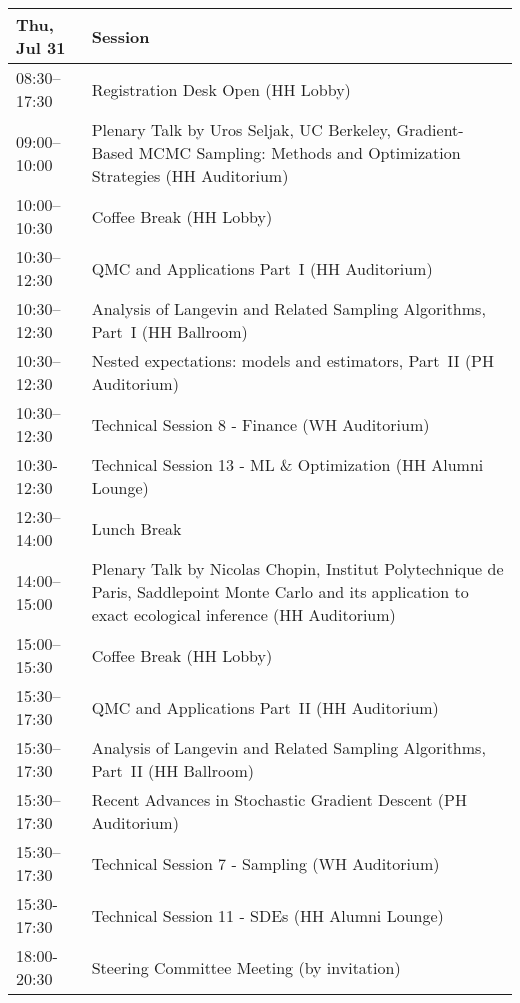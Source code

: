 \begin{table}
{\footnotesize
\begin{tabularx}{\textwidth}{>{\hsize=0.32\hsize}X|>{\hsize=1.7\hsize}X}
\hline
\textbf{Thu, Jul 31} & \textbf{Session} \\
\hline
\cellcolor{\EmptyColor}08:30–17:30 & \cellcolor{\EmptyColor}Registration Desk Open (HH Lobby) \\
\cellcolor{\PlenaryColor}09:00–10:00 & \cellcolor{\PlenaryColor}Plenary Talk by Uros Seljak, UC Berkeley, Gradient-Based MCMC Sampling: Methods and Optimization Strategies (HH Auditorium) \\
\cellcolor{\EmptyColor}10:00–10:30 & \cellcolor{\EmptyColor}Coffee Break (HH Lobby) \\
\cellcolor{\SessionTitleColor}10:30–12:30 & \cellcolor{\SessionTitleColor}QMC and Applications Part~I (HH Auditorium) \\
\cellcolor{\SessionTitleColor}10:30–12:30 & \cellcolor{\SessionTitleColor}Analysis of Langevin and Related Sampling Algorithms, Part~I (HH Ballroom) \\
\cellcolor{\SessionTitleColor}10:30–12:30 & \cellcolor{\SessionTitleColor}Nested expectations: models and estimators, Part~II (PH Auditorium) \\
\cellcolor{\SessionLightColor}10:30–12:30 & \cellcolor{\SessionLightColor}Technical Session 8 - Finance (WH Auditorium) \\
\cellcolor{\SessionLightColor}10:30-12:30 & \cellcolor{\SessionLightColor}Technical Session 13 - ML \& Optimization (HH Alumni Lounge) \\
\cellcolor{\EmptyColor}12:30–14:00 & \cellcolor{\EmptyColor}Lunch Break \\
\cellcolor{\PlenaryColor}14:00–15:00 & \cellcolor{\PlenaryColor}Plenary Talk by Nicolas Chopin, Institut Polytechnique de Paris, Saddlepoint Monte Carlo and its application to exact ecological inference (HH Auditorium) \\
\cellcolor{\EmptyColor}15:00–15:30 & \cellcolor{\EmptyColor}Coffee Break (HH Lobby) \\
\cellcolor{\SessionTitleColor}15:30–17:30 & \cellcolor{\SessionTitleColor}QMC and Applications Part~II (HH Auditorium) \\
\cellcolor{\SessionTitleColor}15:30–17:30 & \cellcolor{\SessionTitleColor}Analysis of Langevin and Related Sampling Algorithms, Part~II (HH Ballroom) \\
\cellcolor{\SessionTitleColor}15:30–17:30 & \cellcolor{\SessionTitleColor}Recent Advances in Stochastic Gradient Descent (PH Auditorium) \\
\cellcolor{\SessionLightColor}15:30–17:30 & \cellcolor{\SessionLightColor}Technical Session 7 - Sampling (WH Auditorium) \\
\cellcolor{\SessionLightColor}15:30-17:30 & \cellcolor{\SessionLightColor}Technical Session 11 - SDEs (HH Alumni Lounge) \\
\cellcolor{\SessionTitleColor}18:00-20:30 & \cellcolor{\SessionTitleColor}Steering Committee Meeting (by invitation) \\
\hline
\end{tabularx}
}
\end{table}

